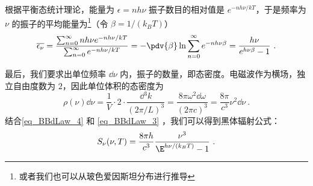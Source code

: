 根据平衡态统计理论，能量为 $\epsilon=nh\nu$ 振子数目的相对值是 $e^{-nh\nu/kT}$，于是频率为 $\nu$ 的振子的平均能量为\footnote{或者我们也可以从玻色爱因斯坦分布进行推导}（令 $\beta = 1/(k_BT)$）
\begin{equation}\label{eq_BBdLaw_4}
\overline{\epsilon_\nu}=\frac{\sum_{n=0}^\infty nh\nu e^{-nh\nu/kT}}{\sum_{n=0}^\infty e^{-nh\nu/kT}}=-\pdv{\beta}\ln \sum_{n=0}^\infty e^{-nh\nu\beta}=\frac{h\nu}{e^{h\nu\beta}-1}~.
\end{equation}


最后，我们要求出单位频率 $\dd \nu$ 内，振子的数量，即态密度。电磁波作为横场，独立自由度数为 $2$，因此单位体积的态密度为
\begin{equation}\label{eq_BBdLaw_3}
\rho(\nu) \dd \nu= \frac{1}{V}\cdot 2\cdot \frac{\dd{} ^3 k}{(2\pi/L)^3}=\frac{8\pi \omega^2 \dd \omega}{(2\pi c)^3}= \frac{8\pi}{c^3}\nu^2\dd \nu~.
\end{equation}
结合\autoref{eq_BBdLaw_4} 和 \autoref{eq_BBdLaw_3} ，我们可以得到黑体辐射公式：
\begin{equation}
S_\nu(\nu,T) = \frac{8\pi h}{c^3}\frac{\nu^3}{\E^{h\nu/(k_B T)} - 1}~.
\end{equation}
